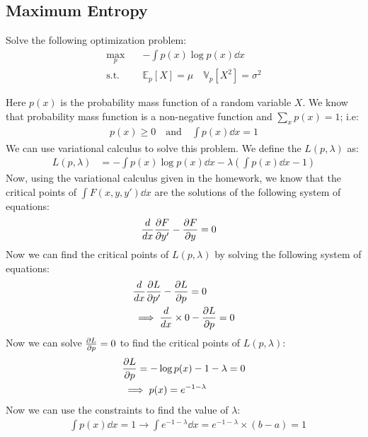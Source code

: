 \documentclass[12pt]{article}
\begin{document}
\subsection{Maximum Entropy}
Solve the following optimization problem:
\begin{align*}
    \max_{p} \quad    & { - \int p(x) \log p(x) \dd{x} }                                 \\
    \text{s.t.} \quad & \mathbb{E}_p [ X ]   = \mu \quad \mathbb{V}_p [ X^2 ] = \sigma^2
\end{align*}

\begin{qsolve}[solution]
    Here $p(x)$ is the probability mass function of a random variable $X$. We know that probability mass function is a non-negative function and $\sum_{x} p(x) = 1$; i.e:
    \begin{align*}
        p(x) \geq 0 \quad \text{and} \quad \int p(x) \dd{x} = 1
    \end{align*}
    We can use variational calculus to solve this problem. We define the $L(p, \lambda)$ as:
    \begin{align*}
        L(p, \lambda) & = - \int p(x) \log p(x) \dd{x} - \lambda \left( \int p(x) \dd{x} - 1 \right)
    \end{align*}
    Now, using the variational calculus given in the homework, we know that the critical points of $\int F(x, y ,y') \dd{x}$ are the solutions of the following system of equations:
    \begin{align*}
        \frac{d}{dx} \pdv{F}{y'} - \pdv{F}{y} & = 0
    \end{align*}
    Now we can find the critical points of $L(p, \lambda)$ by solving the following system of equations:
    \begin{align*}
         & \frac{d}{dx} \pdv{L}{p'} - \pdv{L}{p}        = 0 \\
         & \implies \frac{d}{dx} \times 0 - \pdv{L}{p}  = 0
    \end{align*}
    Now we can solve $\pdv{L}{p} = 0$ to find the critical points of $L(p, \lambda)$:
    \begin{align*}
         & \pdv{L}{p}     = - \log p(x) - 1 - \lambda = 0 \\
         & \implies p(x)  = e^{-1-\lambda}
    \end{align*}
    Now we can use the constraints to find the value of $\lambda$:
    \begin{align*}
         & \int p(x) \dd{x}  = 1 \rightarrow \int e^{-1-\lambda} \dd{x} =e^{-1-\lambda} \times (b-a) = 1 \\

\end{align*}
\end{qsolve}
\end{document}
